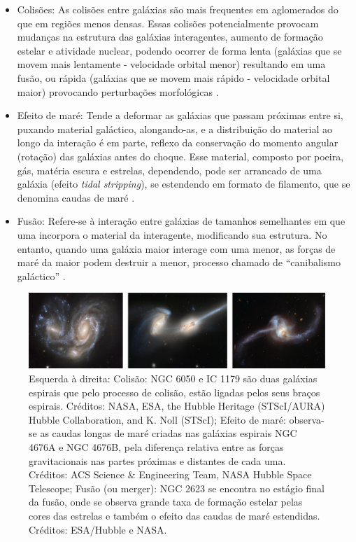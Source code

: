 \begin{itemize}
	\item Colisões: As colisões entre galáxias são mais frequentes em aglomerados do que em regiões menos densas. Essas colisões potencialmente provocam mudanças na estrutura das galáxias interagentes, aumento de formação estelar e atividade nuclear, podendo ocorrer de forma lenta (galáxias que se movem mais lentamente - velocidade orbital menor) resultando em uma fusão, ou rápida  (galáxias que se movem mais rápido - velocidade orbital maior) provocando perturbações morfológicas \cite{2023Muller}.
	\item Efeito de maré: Tende a deformar as galáxias que passam próximas entre si, puxando material galáctico, alongando-as, e a distribuição do material ao longo da interação é em parte, reflexo da conservação do momento angular (rotação) das galáxias antes do choque. Esse material, composto por poeira, gás, matéria escura e estrelas, dependendo, pode ser arrancado de uma galáxia (efeito \emph{tidal stripping}), se estendendo em formato de filamento, que se denomina caudas de maré \cite{2023Kepler, 2023Muller}. 
	\item Fusão: Refere-se à interação entre galáxias de tamanhos semelhantes em que uma incorpora o material da interagente, modificando sua estrutura. No entanto, quando uma galáxia maior interage com uma menor, as forças de maré da maior podem destruir a menor, processo chamado de ``canibalismo galáctico'' \cite{2023Muller}.
\end{itemize}

\begin{figure}[!h] 
  \centering 
  \includegraphics[width=1.0\textwidth]{Imagens/int_08.png} 
  \caption[Interação entre galáxias.]{Esquerda à direita: Colisão: NGC 6050 e IC 1179 são duas galáxias espirais que pelo processo de colisão, estão ligadas pelos seus braços espirais. Créditos: NASA, ESA, the Hubble Heritage (STScI/AURA) Hubble Collaboration, and K. Noll (STScI); Efeito de maré: observa-se as caudas longas de maré criadas nas galáxias espirais NGC 4676A e NGC 4676B, pela diferença relativa entre as forças gravitacionais nas partes próximas e distantes de cada uma. Créditos: ACS Science \& Engineering Team, NASA Hubble Space Telescope; Fusão (ou merger): NGC 2623 se encontra no estágio final da fusão, onde se observa grande taxa de formação estelar pelas cores das estrelas e também o efeito das caudas de maré estendidas. Créditos: ESA/Hubble e NASA.}
  \label{fig:interações} 
\end{figure}

